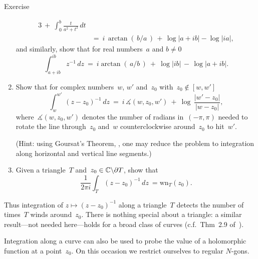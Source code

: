 \documentclass[a]{subfiles}
\begin{document}
\begin{parsec}
\begin{point}[invint]{Exercise}
\begin{enumerate}
\begin{alignat*}{3}
	\ +\ 
	\int_0^b \frac{t}{a^2+t^2}\,dt\\
	\ &=\ 
	\textstyle
	i\,\arctan(\,b/a\,)
	\,+\, \log\left|a+ib\right| - \log\left|ia\right|,
\end{alignat*}
and similarly, show that for real numbers~$a$ and $b\neq 0$
\begin{equation*}
	\int_{a+ib}^{ib} z^{-1}\,dz
	\ = \ 
	i\arctan(\,a/b\,) \ +\ 
	\log\left|ib\right| \,-\,
	\log\left|a+ib\right|.
\end{equation*}
	\item
Show that for complex numbers~$w$, $w'$ and~$z_0$
with~$z_0\notin [w,w']$
\begin{equation*}
	\int_{w}^{w'}\,(z-z_0)^{-1}\,dz
\ = \ 
i\, \measuredangle(w,z_0,w')\ +\ 
\log\,\frac{\left|w'-z_0\right|}{\left|w-z_0\right|},
\end{equation*}
where~$\measuredangle(w,z_0,w')$
denotes
the number of radians
in~$(-\pi,\pi)$
needed
to rotate the line through~$z_0$ and~$w$
counterclockwise around~$z_0$ to hit~$w'$.

(Hint: 
using Goursat's Theorem, ,
one may reduce the problem
to integration along horizontal and vertical line segments.)
\item
Given a triangle~$T$ and~$z_0\in\mathbb{C}\backslash \partial T$,
show that
\begin{equation*}
	\frac{1}{2\pi i}\int_T (z-z_0)^{-1}\,dz
	\ =  \mathrm{wn}_T(z_0).
\end{equation*}
\end{enumerate}
\end{point}
\begin{point}%
Thus integration of 
$z\mapsto (z-z_0)^{-1}$
along a triangle~$T$ detects
the number of times~$T$ winds
around~$z_0$.
There is nothing special about a triangle:
a similar result---not needed here---holds
for a broad class of curves
(c.f.~Thm~2.9 of~\cite{conway2013}).

Integration along a curve can also be used
to probe the value of a holomorphic function at a point~$z_0$.
On this occasion
we restrict ourselves
to regular $N$-gons.
\end{point}
\end{parsec}%
\end{document}
